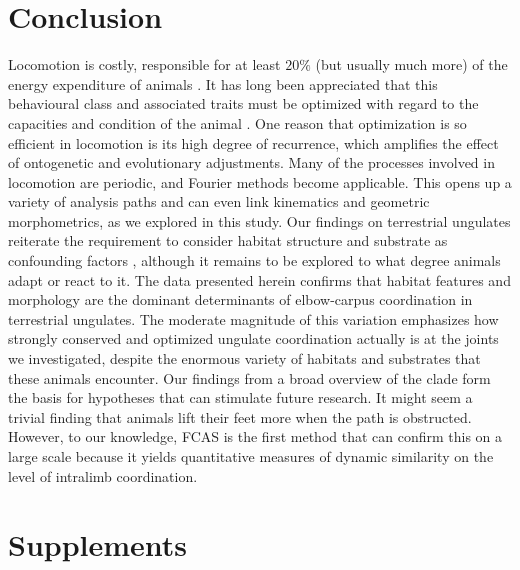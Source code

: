 \FloatBarrier\clearpage
\section{Conclusion}
Locomotion is costly, responsible for at least $20\%$ (but usually much more) of the energy expenditure of animals \citep{Rezende2009,Girard2001}.
It has long been appreciated that this behavioural class and associated traits must be optimized with regard to the capacities and condition of the animal \citep{Hoyt1981,Reilly2007}.
One reason that optimization is so efficient in locomotion is its high degree of recurrence, which amplifies the effect of ontogenetic and evolutionary adjustments.
Many of the processes involved in locomotion are periodic, and Fourier methods become applicable.
This opens up a variety of analysis paths and can even link kinematics and geometric morphometrics, as we explored in this study.
Our findings on terrestrial ungulates reiterate the requirement to consider habitat structure and substrate as confounding factors \citep[\textit{cf.}][]{Johnson2002,Lejeune1998,Shepard2013}, although it remains to be explored to what degree animals adapt or react to it.
The data presented herein confirms that habitat features and morphology are the dominant determinants of elbow-carpus coordination in terrestrial ungulates.
The moderate magnitude of this variation emphasizes how strongly conserved and optimized ungulate coordination actually is at the joints we investigated, despite the enormous variety of habitats and substrates that these animals encounter.
Our findings from a broad overview of the clade form the basis for hypotheses that can stimulate future research.
It might seem a trivial finding that animals lift their feet more when the path is obstructed.
However, to our knowledge, FCAS is the first method that can confirm this on a large scale because it yields quantitative measures of dynamic similarity on the level of intralimb coordination.


\FloatBarrier\clearpage

\section{Supplements}
